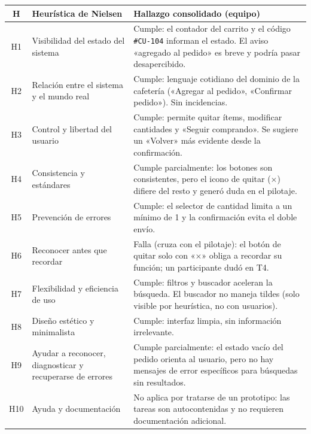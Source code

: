 \documentclass{article}
\begin{document}
\begin{center}
\small
\begin{tabular}{|c|l|p{6.6cm}|}
\hline
\textbf{H} & \textbf{Heurística de Nielsen} & \textbf{Hallazgo consolidado (equipo)} \\
\hline
H1 & Visibilidad del estado del sistema & Cumple: el contador del carrito y el código \texttt{\#CU-104} informan el estado. El aviso «agregado al pedido» es breve y podría pasar desapercibido. \\
\hline
H2 & Relación entre el sistema y el mundo real & Cumple: lenguaje cotidiano del dominio de la cafetería («Agregar al pedido», «Confirmar pedido»). Sin incidencias. \\
\hline
H3 & Control y libertad del usuario & Cumple: permite quitar ítems, modificar cantidades y «Seguir comprando». Se sugiere un «Volver» más evidente desde la confirmación. \\
\hline
H4 & Consistencia y estándares & Cumple parcialmente: los botones son consistentes, pero el icono de quitar ($\times$) difiere del resto y generó duda en el pilotaje. \\
\hline
H5 & Prevención de errores & Cumple: el selector de cantidad limita a un mínimo de 1 y la confirmación evita el doble envío. \\
\hline
H6 & Reconocer antes que recordar & Falla (cruza con el pilotaje): el botón de quitar solo con «$\times$» obliga a recordar su función; un participante dudó en T4. \\
\hline
H7 & Flexibilidad y eficiencia de uso & Cumple: filtros y buscador aceleran la búsqueda. El buscador no maneja tildes (solo visible por heurística, no con usuarios). \\
\hline
H8 & Diseño estético y minimalista & Cumple: interfaz limpia, sin información irrelevante. \\
\hline
H9 & Ayudar a reconocer, diagnosticar y recuperarse de errores & Cumple parcialmente: el estado vacío del pedido orienta al usuario, pero no hay mensajes de error específicos para búsquedas sin resultados. \\
\hline
H10 & Ayuda y documentación & No aplica por tratarse de un prototipo: las tareas son autocontenidas y no requieren documentación adicional. \\
\hline
\end{tabular}
\end{center}
\end{document}
